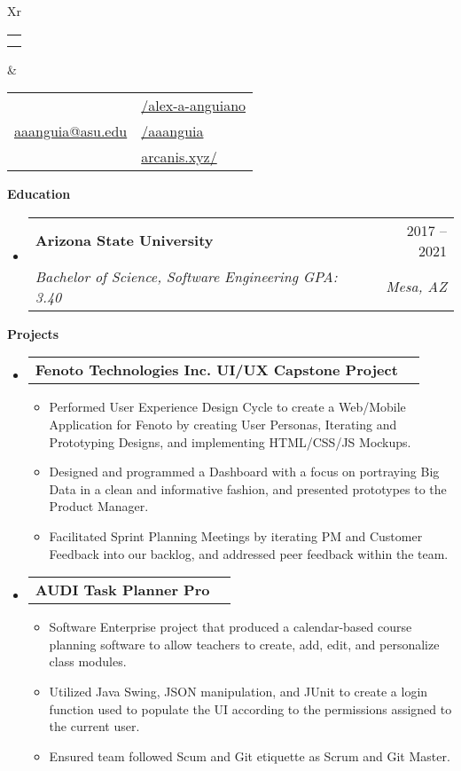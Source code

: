 \documentclass[letterpaper,12pt]{article}[leftmargin=*]
\makeatletter
\def \fullname {Alex Anguiano}
\def \subtitle {}
\def \linkedinicon {\faLinkedin}
\def \linkedinlink {https://www.linkedin.com/in/alex-a-anguiano/}
\def \linkedintext {/alex-a-anguiano}
\def \phoneicon {\faPhone}
\def \phonetext {+1-480-335-2816}
\def \emailicon {\faEnvelope}
\def \emaillink {mailto:aaanguia@asu.edu}
\def \emailtext {aaanguia@asu.edu}
\def \githubicon {\faGithub}
\def \githublink {https://github.com/aaanguia}
\def \githubtext {/aaanguia}
\def \websiteicon {\faGlobe}
\def \websitelink {http://arcanis.xyz/}
\def \websitetext {arcanis.xyz/}
\def \headertype {\doublecol} %
\def \entryspacing {-0pt}
\def \linkedin {\linkedinicon \hspace{3pt}\href{\linkedinlink}{\linkedintext}}
\def \phone {\phoneicon \hspace{3pt}{ \phonetext}}
\def \email {\emailicon \hspace{3pt}\href{\emaillink}{\emailtext}}
\def \github {\githubicon \hspace{3pt}\href{\githublink}{\githubtext}}
\def \website {\websiteicon \hspace{3pt}\href{\websitelink}{\websitetext}}
\renewcommand{\section}[2]{\vspace{5pt}
  \colorbox{secondary}{\color{white}\raggedbottom\normalsize\textbf{{#1}{\hspace{7pt}#2}}}
}
\newcommand{\resumeEntryStart}{\begin{itemize}[leftmargin=2.5mm]}
\newcommand{\resumeEntryEnd}{\end{itemize}\vspace{\entryspacing}}
\newcommand{\resumeItemListStart}{\begin{itemize}[leftmargin=4.5mm]}
\newcommand{\resumeItemListEnd}{\end{itemize}}
\newcommand{\resumeItem}[1]{
  \item\small{
    {#1 \vspace{-2pt}}
  }
}
\newcommand{\resumeEntryTSDL}[4]{
  \vspace{-1pt}\item[]
    \begin{tabularx}{0.97\textwidth}{X@{\hspace{60pt}}r}
      \textbf{\color{primary}#1} & {\firabook\color{accent}\small#2} \\
      \textit{\color{accent}\small#3} & \textit{\color{accent}\small#4} \\
    \end{tabularx}\vspace{-6pt}
}
\newcommand{\resumeEntryTD}[2]{
  \vspace{-1pt}\item[]
    \begin{tabularx}{0.97\textwidth}{X@{\hspace{60pt}}r}
      \textbf{\color{primary}#1} & {\firabook\color{accent}\small#2} \\
    \end{tabularx}\vspace{-6pt}
}
\newcommand{\doublecol}[6]{
  \begin{tabularx}{\textwidth}{Xr}
    {
      \begin{tabular}[c]{l}
        \fontsize{35}{45}\selectfont{\color{primary}{{\textbf{\fullname}}}} \\
        {\textit{\subtitle}} %
      \end{tabular}
    } & {
      \begin{tabular}[c]{l@{\hspace{1.5em}}l}
        {\small#4} & {\small#1} \\
        {\small#5} & {\small#2} \\
        {\small#6} & {\small#3}
      \end{tabular}
    }
  \end{tabularx}
}
\newcommand{\singlecol}[6]{
  \begin{tabularx}{\textwidth}{Xr}
    {
      \begin{tabular}[b]{l}
        \fontsize{35}{45}\selectfont{\color{primary}{{\textbf{\fullname}}}} \\
        {\textit{\subtitle}} %
      \end{tabular}
    } & {
      \begin{tabular}[c]{l}
        {\small#1} \\
        {\small#2} \\
        {\small#3} \\
        {\small#4} \\
        {\small#5} \\
        {\small#6}
      \end{tabular}
    }
  \end{tabularx}
}
\makeatother
\begin{document}


\headertype{\linkedin}{\github}{\website}{\phone}{\email}{} %
\vspace{-10pt} %

\section{\faGraduationCap}{Education}

  \resumeEntryStart
    \resumeEntryTSDL
      {Arizona State University}{2017 -- 2021}
      {Bachelor of Science, Software Engineering \quad GPA: 3.40}{Mesa, AZ}
  \resumeEntryEnd

\section{\faFlask}{Projects}



  \resumeEntryStart
    \resumeEntryTD
      {Fenoto Technologies Inc. UI/UX Capstone Project}{}

    \resumeItemListStart
        \resumeItem {Performed User Experience Design Cycle to create a Web/Mobile Application for Fenoto by creating User Personas, Iterating and Prototyping Designs, and implementing HTML/CSS/JS Mockups.}
        \resumeItem {Designed and programmed a Dashboard with a focus on portraying Big Data in a clean and informative fashion, and presented prototypes to the Product Manager.}
        \resumeItem {Facilitated Sprint Planning Meetings by iterating PM and Customer Feedback into our backlog, and addressed peer feedback within the team. }
    \resumeItemListEnd
  \resumeEntryEnd
  
  \resumeEntryStart
    \resumeEntryTD
      {AUDI Task Planner Pro}{}
    \resumeItemListStart
      \resumeItem {Software Enterprise project that produced a calendar-based course planning software to allow teachers to create, add, edit, and personalize class modules.}
      \resumeItem {Utilized Java Swing, JSON manipulation, and JUnit to create a login function used to populate the UI according to the permissions assigned to the current user.  }
        \resumeItem {Ensured team followed Scum and Git etiquette as Scrum and Git Master. }
    \resumeItemListEnd
  \resumeEntryEnd
\end{document}
